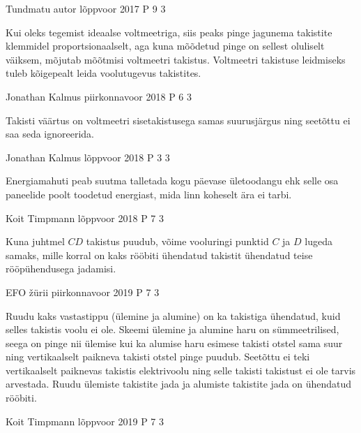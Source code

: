 \documentclass[11pt]{article}
\begin{document}
{%
{Tundmatu autor} %
{lõppvoor} %
{2017} %
{P 9} %
{3} %
{

\ifHint
Kui oleks tegemist ideaalse voltmeetriga, siis peaks pinge jagunema takistite klemmidel proportsionaalselt, aga kuna mõõdetud pinge on sellest oluliselt väiksem, mõjutab mõõtmisi voltmeetri takistus. Voltmeetri takistuse leidmiseks tuleb kõigepealt leida voolutugevus takistites.
\fi
}

{Jonathan Kalmus} %
{piirkonnavoor} %
{2018} %
{P 6} %
{3} %
{

\ifHint
Takisti väärtus on voltmeetri sisetakistusega samas suurusjärgus ning seetõttu ei saa seda ignoreerida.
\fi
}

{Jonathan Kalmus} %
{lõppvoor} %
{2018} %
{P 3} %
{3} %
{

\ifHint
Energiamahuti peab suutma talletada kogu päevase ületoodangu ehk selle osa paneelide poolt toodetud energiast, mida linn koheselt ära ei tarbi.
\fi
}

{Koit Timpmann} %
{lõppvoor} %
{2018} %
{P 7} %
{3} %
{

\ifHint
Kuna juhtmel $CD$ takistus puudub, võime vooluringi punktid $C$ ja $D$ lugeda samaks, mille korral on kaks rööbiti ühendatud takistit ühendatud teise rööpühendusega jadamisi.
\fi
}

{EFO žürii} %
{piirkonnavoor} %
{2019} %
{P 7} %
{3} %
{

\ifHint
Ruudu kaks vastastippu (ülemine ja alumine) on ka takistiga ühendatud, kuid selles takistis voolu ei ole. Skeemi ülemine ja alumine haru on sümmeetrilised, seega on pinge nii ülemise kui ka alumise haru esimese takisti otstel sama suur ning vertikaalselt paikneva takisti otstel pinge puudub. Seetõttu ei teki vertikaalselt paiknevas takistis elektrivoolu ning selle takisti takistust ei ole tarvis arvestada. Ruudu ülemiste takistite jada ja alumiste takistite jada on ühendatud rööbiti.
\fi
}

{Koit Timpmann} %
{lõppvoor} %
{2019} %
{P 7} %
{3} %
{

}}
\end{document}
